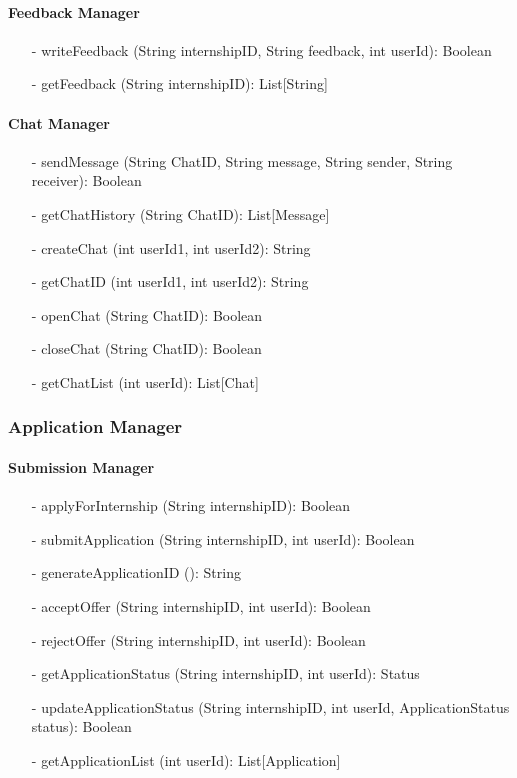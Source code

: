 \paragraph{Feedback Manager}
\begin{itemize}
    \item[-] writeFeedback (String internshipID, String feedback, int userId): Boolean
    \item[-] getFeedback (String internshipID): List[String]
\end{itemize}

\paragraph{Chat Manager}
\begin{itemize}
    \item[-] sendMessage (String ChatID, String message, String sender, String receiver): Boolean
    \item[-] getChatHistory (String ChatID): List[Message]
    \item[-] createChat (int userId1, int userId2): String
    \item[-] getChatID (int userId1, int userId2): String
    \item[-] openChat (String ChatID): Boolean
    \item[-] closeChat (String ChatID): Boolean
    \item[-] getChatList (int userId): List[Chat]
\end{itemize}


\subsubsection{Application Manager}
\paragraph{Submission Manager}
\begin{itemize}
    \item[-] applyForInternship (String internshipID): Boolean
    \item[-] submitApplication (String internshipID, int userId): Boolean
    \item[-] generateApplicationID (): String
    \item[-] acceptOffer (String internshipID, int userId): Boolean
    \item[-] rejectOffer (String internshipID, int userId): Boolean
    \item[-] getApplicationStatus (String internshipID, int userId): Status
    \item[-] updateApplicationStatus (String internshipID, int userId, ApplicationStatus status): Boolean
    \item[-] getApplicationList (int userId): List[Application]
\end{itemize}

